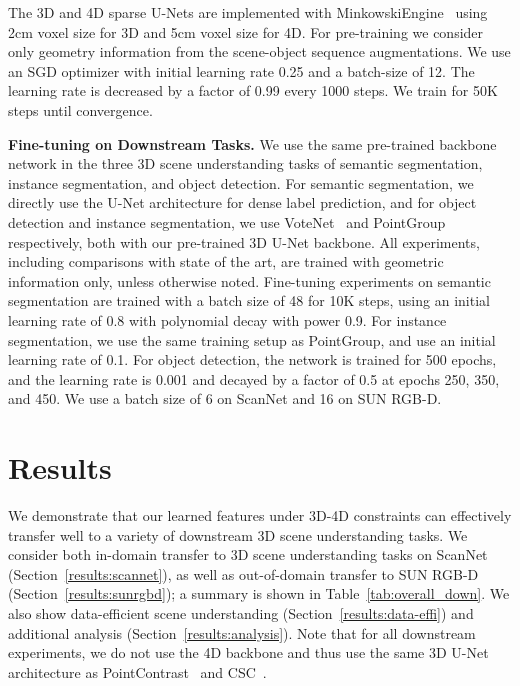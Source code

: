\documentclass[runningheads]{llncs}
\begin{document}
The 3D and 4D sparse U-Nets are implemented with MinkowskiEngine~\cite{choy20194d} using 2cm voxel size for 3D and 5cm voxel size for 4D. 
For pre-training we consider only geometry information from the scene-object sequence augmentations.
We use an SGD optimizer with initial learning rate 0.25 and a batch-size of 12. The learning rate is decreased by a factor of 0.99 every 1000 steps. 
We train for 50K steps until convergence. 

\noindent \textbf{Fine-tuning on Downstream Tasks.}
We use the same pre-trained backbone network in the three 3D scene understanding tasks of semantic segmentation, instance segmentation, and object detection.
For semantic segmentation, we directly use the U-Net architecture for dense label prediction, and for object detection and  instance segmentation, we use VoteNet~\cite{qi2019deep} and PointGroup~\cite{jiang2020pointgroup} respectively, both with our pre-trained 3D U-Net backbone.
All experiments, including comparisons with state of the art, are trained with geometric information only, unless otherwise noted.
Fine-tuning experiments on semantic segmentation are trained with a batch size of 48 for 10K steps, using an initial learning rate of 0.8 with polynomial decay with power 0.9.
For instance segmentation, we use the same training setup as PointGroup, and use an initial learning rate of 0.1.
For object detection, the network is trained for 500 epochs, and the learning rate is 0.001 and decayed by a factor of 0.5 at epochs 250, 350, and 450. 
We use a batch size of 6 on ScanNet and 16 on SUN RGB-D.

\section{Results}
We demonstrate that our learned features under 3D-4D constraints can effectively transfer well to a variety of downstream 3D scene understanding tasks.
We consider both in-domain transfer to 3D scene understanding tasks on ScanNet~\cite{dai2017scannet} (Section~\ref{results:scannet}), as well as out-of-domain transfer to SUN RGB-D~\cite{song2015sun} (Section~\ref{results:sunrgbd}); a summary is shown in Table~\ref{tab:overall_down}. We also show data-efficient scene understanding (Section~\ref{results:data-effi}) and additional analysis (Section~\ref{results:analysis}).
Note that for all downstream experiments, we do not use the 4D backbone and thus use the same 3D U-Net architecture as PointContrast~\cite{xie2020pointcontrast} and CSC~\cite{hou2021exploring}.
\end{document}
